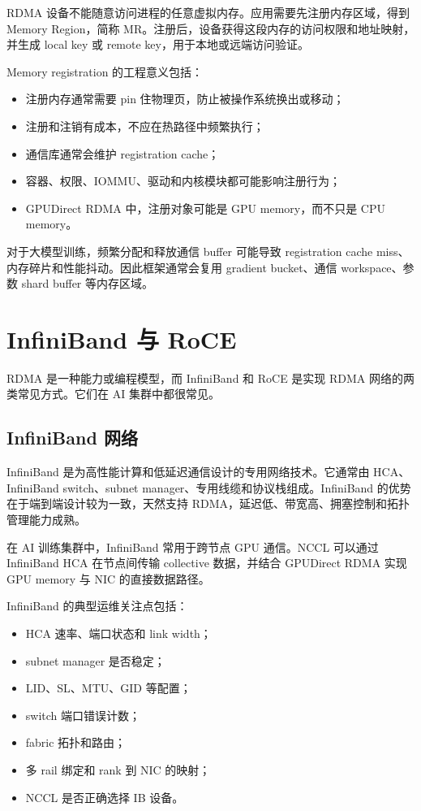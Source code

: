 RDMA 设备不能随意访问进程的任意虚拟内存。应用需要先注册内存区域，得到 Memory Region，简称 MR。注册后，设备获得这段内存的访问权限和地址映射，并生成 local key 或 remote key，用于本地或远端访问验证。

Memory registration 的工程意义包括：

\begin{itemize}
  \item 注册内存通常需要 pin 住物理页，防止被操作系统换出或移动；
  \item 注册和注销有成本，不应在热路径中频繁执行；
  \item 通信库通常会维护 registration cache；
  \item 容器、权限、IOMMU、驱动和内核模块都可能影响注册行为；
  \item GPUDirect RDMA 中，注册对象可能是 GPU memory，而不只是 CPU memory。
\end{itemize}

对于大模型训练，频繁分配和释放通信 buffer 可能导致 registration cache miss、内存碎片和性能抖动。因此框架通常会复用 gradient bucket、通信 workspace、参数 shard buffer 等内存区域。

\section{InfiniBand 与 RoCE}
\label{sec:infiniband-and-roce}

RDMA 是一种能力或编程模型，而 InfiniBand 和 RoCE 是实现 RDMA 网络的两类常见方式。它们在 AI 集群中都很常见。

\subsection{InfiniBand 网络}
\label{subsec:infiniband-network}

InfiniBand 是为高性能计算和低延迟通信设计的专用网络技术。它通常由 HCA、InfiniBand switch、subnet manager、专用线缆和协议栈组成。InfiniBand 的优势在于端到端设计较为一致，天然支持 RDMA，延迟低、带宽高、拥塞控制和拓扑管理能力成熟。

在 AI 训练集群中，InfiniBand 常用于跨节点 GPU 通信。NCCL 可以通过 InfiniBand HCA 在节点间传输 collective 数据，并结合 GPUDirect RDMA 实现 GPU memory 与 NIC 的直接数据路径。

InfiniBand 的典型运维关注点包括：

\begin{itemize}
  \item HCA 速率、端口状态和 link width；
  \item subnet manager 是否稳定；
  \item LID、SL、MTU、GID 等配置；
  \item switch 端口错误计数；
  \item fabric 拓扑和路由；
  \item 多 rail 绑定和 rank 到 NIC 的映射；
  \item NCCL 是否正确选择 IB 设备。
\end{itemize}

